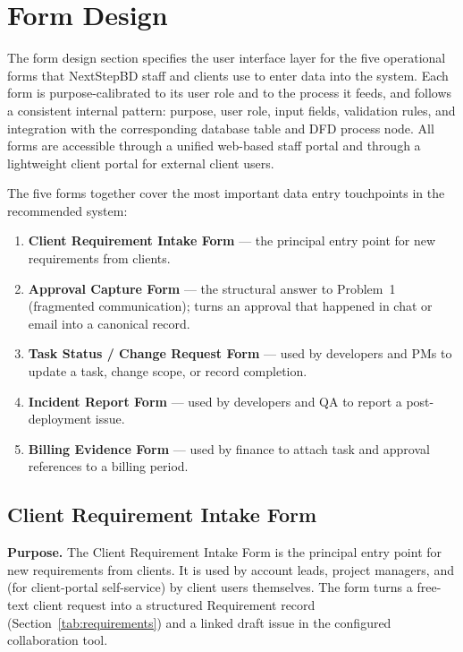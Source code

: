 \documentclass[12pt,a4paper]{report}
\begin{document}
\section{Form Design}
\label{sec:design-forms}

The form design section specifies the user interface layer for the five
operational forms that NextStepBD staff and clients use to enter data into
the system. Each form is purpose-calibrated to its user role and to the
process it feeds, and follows a consistent internal pattern: purpose, user
role, input fields, validation rules, and integration with the corresponding
database table and DFD process node. All forms are accessible through a
unified web-based staff portal and through a lightweight client portal for
external client users.

The five forms together cover the most important data entry touchpoints in
the recommended system:

\begin{enumerate}[leftmargin=1.6em]
    \item \textbf{Client Requirement Intake Form} --- the principal entry
          point for new requirements from clients.
    \item \textbf{Approval Capture Form} --- the structural answer to
          Problem~1 (fragmented communication); turns an approval that
          happened in chat or email into a canonical record.
    \item \textbf{Task Status / Change Request Form} --- used by
          developers and PMs to update a task, change scope, or record
          completion.
    \item \textbf{Incident Report Form} --- used by developers and QA to
          report a post-deployment issue.
    \item \textbf{Billing Evidence Form} --- used by finance to attach
          task and approval references to a billing period.
\end{enumerate}

\subsection{Client Requirement Intake Form}
\label{sec:form-intake}

\textbf{Purpose.} The Client Requirement Intake Form is the principal entry
point for new requirements from clients. It is used by account leads, project
managers, and (for client-portal self-service) by client users themselves.
The form turns a free-text client request into a structured Requirement
record (Section~\ref{tab:requirements}) and a linked draft issue in the
configured collaboration tool.
\end{document}

